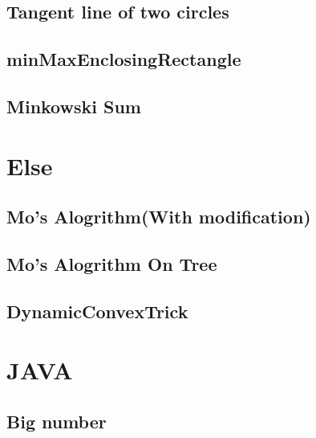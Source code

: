 \subsection{Tangent line of two circles}

\subsection{minMaxEnclosingRectangle}

\subsection{Minkowski Sum}



\section{Else}
\subsection{Mo's Alogrithm(With modification)}

\subsection{Mo's Alogrithm On Tree}

\subsection{DynamicConvexTrick}



\section{JAVA}
\subsection{Big number}


